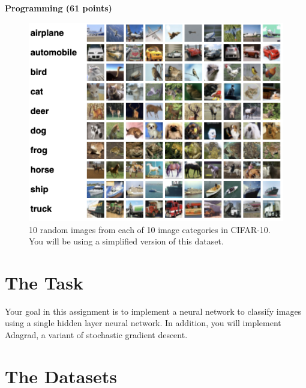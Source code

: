 \documentclass[11pt,addpoints,answers]{exam}
\begin{document}
\clearpage
{\LARGE \bf Programming (61 points)}

\begin{figure}[H]
    \centering
    \captionsetup{justification=centering, margin=2cm}
    \includegraphics[scale=0.6]{img/CIFAR-10.png}
    \caption{10 random images from each of 10 image categories in CIFAR-10. You will be using a simplified version of this dataset.}
    \label{fig:grid}
\end{figure}

\section{The Task}
Your goal in this assignment is to implement a neural network to classify images using a single hidden layer neural network. In addition, you will implement Adagrad, a variant of stochastic gradient descent. 

\section{The Datasets}
\label{sec:dataset}

\end{document}
